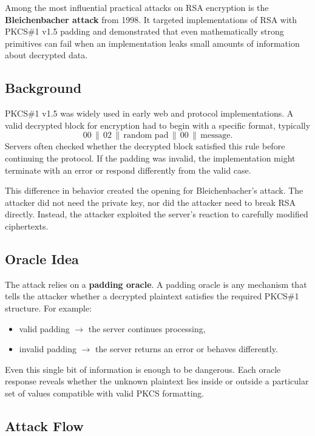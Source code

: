 Among the most influential practical attacks on RSA encryption is the \textbf{Bleichenbacher attack} from 1998. It targeted implementations of RSA with PKCS\#1 v1.5 padding and demonstrated that even mathematically strong primitives can fail when an implementation leaks small amounts of information about decrypted data.

\subsection{Background}

PKCS\#1 v1.5 was widely used in early web and protocol implementations. A valid decrypted block for encryption had to begin with a specific format, typically
\[
00 \,\|\, 02 \,\|\, \text{random pad} \,\|\, 00 \,\|\, \text{message}.
\]
Servers often checked whether the decrypted block satisfied this rule before continuing the protocol. If the padding was invalid, the implementation might terminate with an error or respond differently from the valid case.

This difference in behavior created the opening for Bleichenbacher's attack. The attacker did not need the private key, nor did the attacker need to break RSA directly. Instead, the attacker exploited the server's reaction to carefully modified ciphertexts.

\subsection{Oracle Idea}

The attack relies on a \textbf{padding oracle}. A padding oracle is any mechanism that tells the attacker whether a decrypted plaintext satisfies the required PKCS\#1 structure. For example:

\begin{itemize}
\item valid padding $\rightarrow$ the server continues processing,
\item invalid padding $\rightarrow$ the server returns an error or behaves differently.
\end{itemize}

Even this single bit of information is enough to be dangerous. Each oracle response reveals whether the unknown plaintext lies inside or outside a particular set of values compatible with valid PKCS formatting.

\subsection{Attack Flow}

